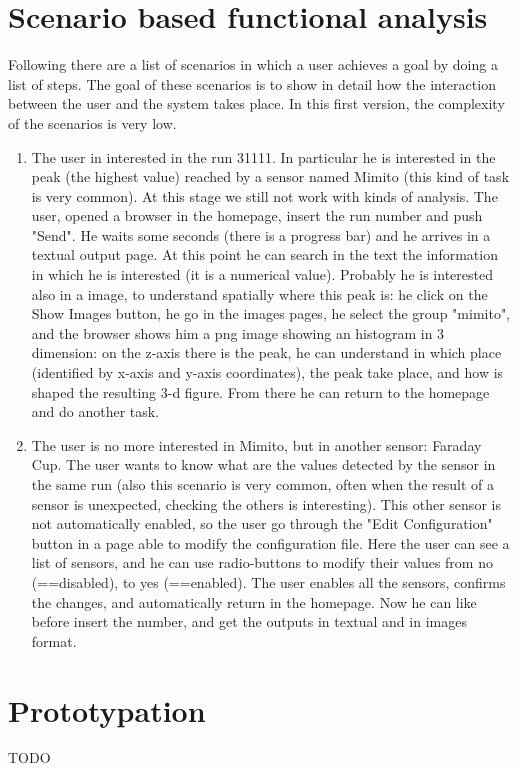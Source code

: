\section{Scenario based functional analysis}

Following there are a list of scenarios in which a user achieves a goal by doing a list of steps. The goal of these scenarios is to show in detail how the interaction between the user and the system takes place. In this first version, the complexity of the scenarios is very low. 

\begin{enumerate}

\item The user in interested in the run 31111. In particular he is interested in the peak (the highest value) reached by a sensor named Mimito (this kind of task is very common). At this stage we still not work with kinds of analysis. The user, opened a browser in the homepage, insert the run number and push "Send". He waits some seconds (there is a progress bar) and he arrives in a textual output page. At this point he can search in the text the information in which he is interested (it is a numerical value). Probably he is interested also in a image, to understand spatially where this peak is: he click on the Show Images button, he go in the images pages, he select the group "mimito", and the browser shows him a png image showing an histogram in 3 dimension: on the z-axis there is the peak, he can understand in which place (identified by x-axis and y-axis coordinates), the peak take place, and how is shaped the resulting 3-d figure. From there he can return to the homepage and do another task.   

\item The user is no more interested in Mimito, but in another sensor: Faraday Cup. The user wants to know what are the values detected by the sensor in the same run (also this scenario is very common, often when the result of a sensor is unexpected, checking the others is interesting). This other sensor is not automatically enabled, so the user go through the "Edit Configuration" button in a page able to modify the configuration file. Here the user can see a list of sensors, and he can use radio-buttons to modify their values from no (==disabled), to yes (==enabled). The user enables all the sensors, confirms the changes, and automatically return in the homepage. Now he can like before insert the number, and get the outputs in textual and in images format.  



\end{enumerate}


\section{Prototypation}
TODO 